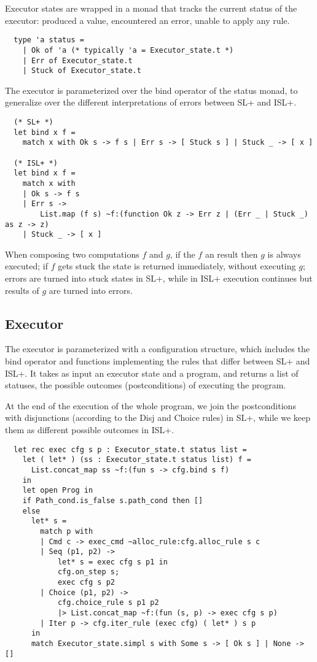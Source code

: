 \documentclass[parskip=half]{scrartcl}
\begin{document}
Executor states are wrapped in a monad that tracks the current status of the executor: produced a value, encountered an error, unable to apply any rule.

\begin{verbatim}
  type 'a status =
    | Ok of 'a (* typically 'a = Executor_state.t *)
    | Err of Executor_state.t
    | Stuck of Executor_state.t
\end{verbatim}

The executor is parameterized over the bind operator of the status monad, to generalize over the different interpretations of errors between SL+ and ISL+.

\begin{verbatim}
  (* SL+ *)
  let bind x f =
    match x with Ok s -> f s | Err s -> [ Stuck s ] | Stuck _ -> [ x ]

  (* ISL+ *)
  let bind x f =
    match x with
    | Ok s -> f s
    | Err s ->
        List.map (f s) ~f:(function Ok z -> Err z | (Err _ | Stuck _) as z -> z)
    | Stuck _ -> [ x ]
\end{verbatim}

When composing two computations \(f\) and \(g\), if the \(f\) an  result then \(g\) is always executed; if \(f\) gets stuck the state is returned immediately, without executing \(g\); errors are turned into stuck states in SL+, while in ISL+ execution continues but  results of \(g\) are turned into errors.

\subsection{Executor}

The executor is parameterized with a configuration structure, which includes the bind operator and functions implementing the rules that differ between SL+ and ISL+. It takes as input an executor state and a program, and returns a list of statuses, the possible outcomes (postconditions) of executing the program.

At the end of the execution of the whole program, we join the postconditions with disjunctions (according to the Disj and Choice rules) in SL+, while we keep them as different possible outcomes in ISL+.

\begin{verbatim}
  let rec exec cfg s p : Executor_state.t status list =
    let ( let* ) (ss : Executor_state.t status list) f =
      List.concat_map ss ~f:(fun s -> cfg.bind s f)
    in
    let open Prog in
    if Path_cond.is_false s.path_cond then []
    else
      let* s =
        match p with
        | Cmd c -> exec_cmd ~alloc_rule:cfg.alloc_rule s c
        | Seq (p1, p2) ->
            let* s = exec cfg s p1 in
            cfg.on_step s;
            exec cfg s p2
        | Choice (p1, p2) ->
            cfg.choice_rule s p1 p2
            |> List.concat_map ~f:(fun (s, p) -> exec cfg s p)
        | Iter p -> cfg.iter_rule (exec cfg) ( let* ) s p
      in
      match Executor_state.simpl s with Some s -> [ Ok s ] | None -> []
\end{verbatim}
\end{document}
